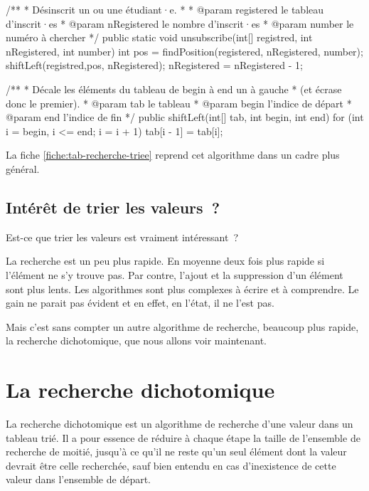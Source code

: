 			\begin{java}
/**
 * Désinscrit un ou une étudiant·e.
 * 
 * @param registered le tableau d'inscrit·es
 * @param nRegistered le nombre d'inscrit·es
 * @param number le numéro à chercher
 */
public static void unsubscribe(int[] registred, int nRegistered,
				int number){
	int pos = findPosition(registered, nRegistered, number);
	shiftLeft(registred,pos, nRegistered);
	nRegistered = nRegistered - 1;
}

/**
 * Décale les éléments du tableau de begin à end un à gauche
 * (et écrase donc le premier).
 * @param tab le tableau
 * @param begin l'indice de départ
 * @param end l'indice de fin
 */
public shiftLeft(int[] tab, int begin, int end){
	for (int i = begin, i <= end; i = i + 1){
		tab[i - 1] = tab[i];
	}
}
			\end{java}
			
			La fiche \vref{fiche:tab-recherche-triee} reprend cet algorithme
			dans un cadre plus général.

		\subsection{Intérêt de trier les valeurs~?}

			Est-ce que trier les valeurs est vraiment intéressant~?
			
			La recherche est un peu plus rapide. En moyenne deux fois plus
			rapide si l'élément ne s'y trouve pas. Par contre, l'ajout et la
			suppression d'un élément sont plus lents.  Les algorithmes sont plus
			complexes à écrire et à comprendre.  Le gain ne parait pas évident
			et en effet, en l’état, il ne l’est pas.
			
			Mais c’est sans compter un autre algorithme de recherche, beaucoup
			plus rapide, la recherche dichotomique, que nous allons voir
			maintenant.
			
	\section{La recherche dichotomique} 

		La recherche dichotomique est un algorithme de recherche d’une valeur
		dans un tableau trié.  Il a pour essence de réduire à chaque étape la
		taille de l’ensemble de recherche de moitié, jusqu’à ce qu’il ne reste
		qu’un seul élément dont la valeur devrait être celle recherchée, sauf
		bien entendu en cas d’inexistence de cette valeur dans l’ensemble de
		départ. 
	
